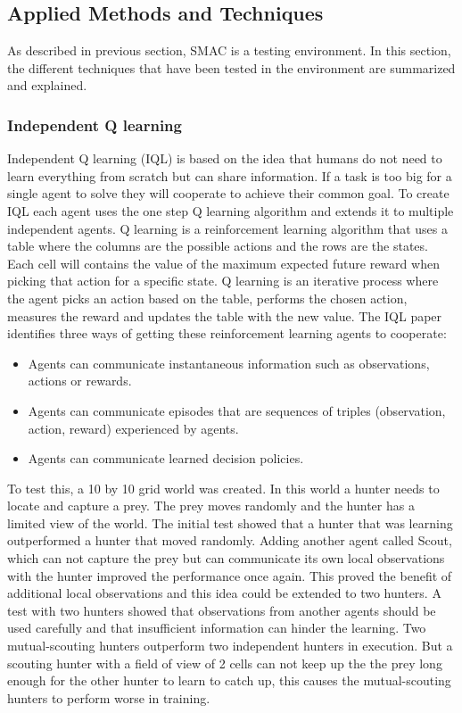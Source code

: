 \subsection{Applied Methods and Techniques}

As described in previous section, SMAC is a testing environment. In this section, the different techniques that have been tested in the environment are summarized and explained.

\subsubsection{Independent Q learning\citep{tan1993multi}}

Independent Q learning (IQL) is based on the idea that humans do not need to learn everything from scratch but can share information. If a task is too big for a single agent to solve they will cooperate to achieve their common goal. To create IQL each agent uses the one step Q learning algorithm\citep{watkins1992q} and extends it to multiple independent agents. Q learning is a reinforcement learning algorithm that uses a table where the columns are the possible actions and the rows are the states. Each cell will contains the value of the maximum expected future reward when picking that action for a specific state. Q learning is an iterative process where the agent picks an action based on the table, performs the chosen action, measures the reward and updates the table with the new value. The IQL paper identifies three ways of getting these reinforcement learning agents to cooperate:
\begin{itemize}
   \item  Agents can communicate instantaneous information such as observations, actions or rewards.
   \item  Agents can communicate episodes that are sequences of triples (observation, action, reward) experienced by agents.
   \item  Agents can communicate learned decision policies.
\end{itemize}

To test this, a 10 by 10 grid world was created. In this world a hunter needs to locate and capture a prey. The prey moves randomly and the hunter has a limited view of the world. The initial test showed that a hunter that was learning outperformed a hunter that moved randomly. Adding another agent called Scout, which can not capture the prey but can communicate its own local observations with the hunter improved the performance once again. This proved the benefit of additional local observations and this idea could be extended to two hunters. A test with two hunters showed that observations from another agents should be used carefully and that insufficient information can hinder the learning. Two mutual-scouting hunters outperform two independent hunters in execution. But a scouting hunter with a field of view of 2 cells can not keep up the the prey long enough for the other hunter to learn to catch up, this causes the mutual-scouting hunters to perform worse in training.

